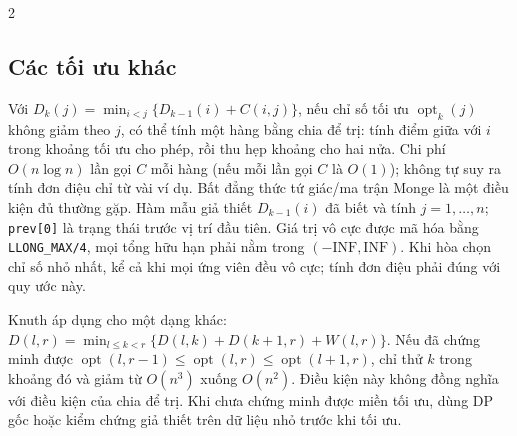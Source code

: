\begin{multicols}{2}
\subsection{Các tối ưu khác}
Với
$D_k(j)=\min_{i<j}\{D_{k-1}(i)+C(i,j)\}$,
nếu chỉ số tối ưu $\operatorname{opt}_k(j)$ không giảm theo $j$,
có thể tính một hàng bằng chia để trị: tính điểm giữa với
$i$ trong khoảng tối ưu cho phép, rồi thu hẹp khoảng cho
hai nửa. Chi phí $O(n\log n)$ lần gọi $C$ mỗi hàng
(nếu mỗi lần gọi $C$ là $O(1)$); không tự suy ra tính đơn
điệu chỉ từ vài ví dụ. Bất đẳng thức tứ giác/ma trận Monge
là một điều kiện đủ thường gặp. Hàm mẫu giả thiết
$D_{k-1}(i)$ đã biết và tính $j=1,\ldots,n$;
\texttt{prev[0]} là trạng thái trước vị trí đầu tiên. Giá trị vô cực
được mã hóa bằng \texttt{LLONG\_MAX/4}, mọi tổng hữu hạn phải
nằm trong $(-\mathrm{INF},\mathrm{INF})$.
Khi hòa chọn chỉ số nhỏ nhất, kể cả khi mọi ứng viên đều vô cực;
tính đơn điệu phải đúng với quy ước này.

Knuth áp dụng cho một dạng khác:
$D(l,r)=\min_{l\le k<r}\{D(l,k)+D(k+1,r)+W(l,r)\}$.
Nếu đã chứng minh được
$\operatorname{opt}(l,r-1)\le\operatorname{opt}(l,r)
\le\operatorname{opt}(l+1,r)$, chỉ thử $k$ trong khoảng
đó và giảm từ $O(n^3)$ xuống $O(n^2)$.
Điều kiện này không đồng nghĩa với điều kiện của chia để trị.
Khi chưa chứng minh được miền tối ưu, dùng DP gốc hoặc
kiểm chứng giả thiết trên dữ liệu nhỏ trước khi tối ưu.
\end{multicols}
\endgroup
